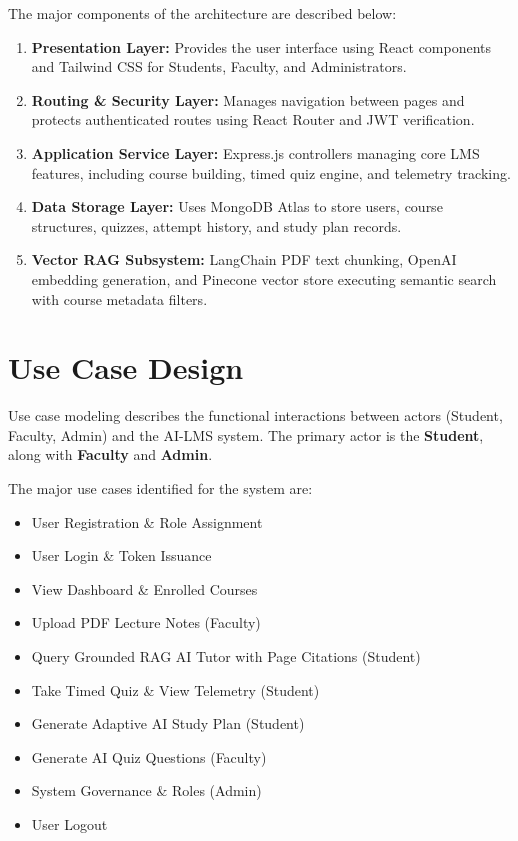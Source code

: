 The major components of the architecture are described below:

\begin{enumerate}
    \item \textbf{Presentation Layer:} Provides the user interface using React components and Tailwind CSS for Students, Faculty, and Administrators.
    
    \item \textbf{Routing \& Security Layer:} Manages navigation between pages and protects authenticated routes using React Router and JWT verification.
    
    \item \textbf{Application Service Layer:} Express.js controllers managing core LMS features, including course building, timed quiz engine, and telemetry tracking.
    
    \item \textbf{Data Storage Layer:} Uses MongoDB Atlas to store users, course structures, quizzes, attempt history, and study plan records.
    
    \item \textbf{Vector RAG Subsystem:} LangChain PDF text chunking, OpenAI embedding generation, and Pinecone vector store executing semantic search with course metadata filters.
\end{enumerate}

\section{Use Case Design}

Use case modeling describes the functional interactions between actors (Student, Faculty, Admin) and the AI-LMS system. The primary actor is the \textbf{Student}, along with \textbf{Faculty} and \textbf{Admin}.

The major use cases identified for the system are:

\begin{itemize}
    \item User Registration \& Role Assignment
    \item User Login \& Token Issuance
    \item View Dashboard \& Enrolled Courses
    \item Upload PDF Lecture Notes (Faculty)
    \item Query Grounded RAG AI Tutor with Page Citations (Student)
    \item Take Timed Quiz \& View Telemetry (Student)
    \item Generate Adaptive AI Study Plan (Student)
    \item Generate AI Quiz Questions (Faculty)
    \item System Governance \& Roles (Admin)
    \item User Logout
\end{itemize}

